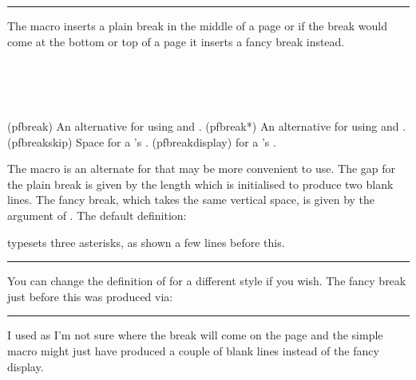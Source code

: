 \fancybreak{\pfbreakdisplay}

    The \cmd{\plainfancybreak} macro inserts a plain break in the middle of
a page or if the break would come at the bottom or top of a page it
inserts a fancy break instead.

\begin{syntax}
\cmd{\pfbreak} \cmd{\pfbreak*} \\
\lnc{\pfbreakskip} \\
\cmd{\pfbreakdisplay} \\
\end{syntax}
\glossary(pfbreak)
  {}%
  {An alternative for  using  
   and .}
\glossary(pfbreak*)
  {}%
  {An alternative for  using  
   and .}
\glossary(pfbreakskip)%
  {}%
  {Space for a 's .}
\glossary(pfbreakdisplay)%
  {}%
  { for a 's .}
  
The \cmd{\pfbreak} macro is an alternate for \cmd{\plainfancybreak} that may
be more convenient to use. The gap for the plain break is given by the
length \lnc{\pfbreakskip} which is initialised to produce two blank lines.
The fancy break, which takes the same vertical space, is given by the
 argument of \cmd{\pfbreakdisplay}. The default definition:
\begin{lcode}
\newcommand*{\pfbreakdisplay}{*\quad*\quad*}
\end{lcode}
typesets three asterisks, as shown a few lines before this.


\renewcommand{\pfbreakdisplay}{%
 \ensuremath{\clubsuit\quad\diamondsuit\quad\clubsuit}}
\fancybreak{\pfbreakdisplay}

    You can change the definition of \cmd{\pfbreakdisplay} for a different
style if you wish. The
fancy break just before this was produced via:
\begin{lcode}
\renewcommand{\pfbreakdisplay}{%
  \ensuremath{\clubsuit\quad\diamondsuit\quad\clubsuit}}
\fancybreak{\pfbreakdisplay}
\end{lcode}
I used \cmd{\fancybreak} as I'm not sure where the break will come on the
page and the simple \cmd{\pfbreak} macro might just have produced a couple
of blank lines instead of the fancy display.

